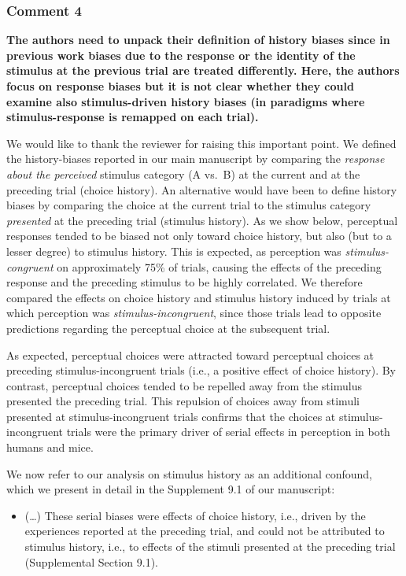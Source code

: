 \documentclass[
]{article}
\providecommand{\tightlist}{%
  \setlength{\itemsep}{0pt}\setlength{\parskip}{0pt}}
\begin{document}
\hypertarget{comment-4-1}{%
\subsubsection{Comment 4}\label{comment-4-1}}

\textbf{The authors need to unpack their definition of history biases
since in previous work biases due to the response or the identity of the
stimulus at the previous trial are treated differently. Here, the
authors focus on response biases but it is not clear whether they could
examine also stimulus-driven history biases (in paradigms where
stimulus-response is remapped on each trial).}

We would like to thank the reviewer for raising this important point. We
defined the history-biases reported in our main manuscript by comparing
the \emph{response about the perceived} stimulus category (A vs.~B) at
the current and at the preceding trial (choice history). An alternative
would have been to define history biases by comparing the choice at the
current trial to the stimulus category \emph{presented} at the preceding
trial (stimulus history). As we show below, perceptual responses tended
to be biased not only toward choice history, but also (but to a lesser
degree) to stimulus history. This is expected, as perception was
\emph{stimulus-congruent} on approximately 75\% of trials, causing the
effects of the preceding response and the preceding stimulus to be
highly correlated. We therefore compared the effects on choice history
and stimulus history induced by trials at which perception was
\emph{stimulus-incongruent}, since those trials lead to opposite
predictions regarding the perceptual choice at the subsequent trial.

As expected, perceptual choices were attracted toward perceptual choices
at preceding stimulus-incongruent trials (i.e., a positive effect of
choice history). By contrast, perceptual choices tended to be repelled
away from the stimulus presented the preceding trial. This repulsion of
choices away from stimuli presented at stimulus-incongruent trials
confirms that the choices at stimulus-incongruent trials were the
primary driver of serial effects in perception in both humans and mice.

We now refer to our analysis on stimulus history as an additional
confound, which we present in detail in the Supplement 9.1 of our
manuscript:

\begin{itemize}
\tightlist
\item
  (\ldots) These serial biases were effects of choice history, i.e.,
  driven by the experiences reported at the preceding trial, and could
  not be attributed to stimulus history, i.e., to effects of the stimuli
  presented at the preceding trial (Supplemental Section 9.1).
\end{itemize}
\end{document}
